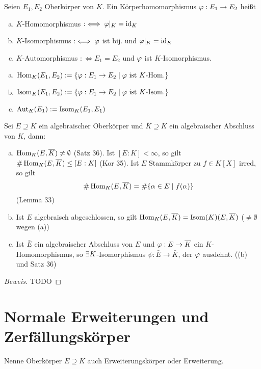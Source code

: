 \documentclass[a4paper]{report}
\begin{document}
\begin{defi}
  Seien $E_{1}, E_{2}$ Oberkörper von $K$. Ein Körperhomomorphismus $\varphi : E_{1} \to E_{2}$ heißt
  \begin{enumerate}[(a)]
    \item $K$-Homomorphismus $:\iff \varphi|_{K} = \operatorname{id}_{K}$
    \item $K$-Isomorphismus $:\iff \varphi$ ist bij. und $\varphi|_{K} = \operatorname{id}_{K}$
    \item $K$-Automorphismus $: \iff E_{1} = E_{2}$ und $\varphi$ ist $K$-Isomorphismus.
  \end{enumerate}
\end{defi}
\begin{nota*}\item
\begin{enumerate}[(a)]
\item $\operatorname{Hom}_{K}(E_{1}, E_{2}) := \{\varphi : E_{1} \to E_{2} \mid \varphi \text{ ist } K\text{-Hom.}\}$
\item $\operatorname{Isom}_{K}(E_{1}, E_{2}) := \{\varphi : E_{1} \to E_{2} \mid \varphi \text{ ist } K\text{-Isom.}\}$
\item $\operatorname{Aut}_{K}(E_{1}) := \operatorname{Isom}_{K}(E_{1}, E_{1})$
\end{enumerate}
\end{nota*}


\begin{kor}
  Sei $E \supseteq K$ ein algebraischer Oberkörper und $\bar K \supseteq K$ ein algebraischer Abschluss von $K$, dann:
  \begin{enumerate}[(a)]
    \item $\operatorname{Hom}_{K}(E, \overline K) \ne \emptyset$ (Satz 36). Ist $[E : K] < \infty$, so gilt $\# \operatorname{Hom}_{K}(E, \overline K) \le [E : K]$ (Kor 35). Ist $E$ Stammkörper zu $f \in K[X]$ irred, so gilt
          \[\# \operatorname{Hom}_{K}(E, \overline K) = \#\{\alpha \in E \mid f(\alpha)\}\]
          (Lemma 33)
    \item Ist $E$ algebraisch abgeschlossen, so gilt $\operatorname{Hom}_{K}(E, \overline K) = \operatorname{Isom}(K)(E, \overline K)$ ($ \ne \emptyset$ wegen (a))
    \item Ist $\bar E$ ein algebraischer Abschluss von $E$ und $\varphi : E \to \overline K$ ein $K$-Homomorphismus, so $\exists K$-Isomorphismus $\psi : \bar E \to \bar K$, der $\varphi$ ausdehnt. ((b) und Satz 36)
  \end{enumerate}
\begin{proof}[Beweis]
TODO
\end{proof}
\end{kor}
\section{Normale Erweiterungen und Zerfällungskörper}
\begin{bez*}
Nenne Oberkörper $E \supseteq K$ auch Erweiterungskörper oder Erweiterung.
\end{bez*}
\end{document}

